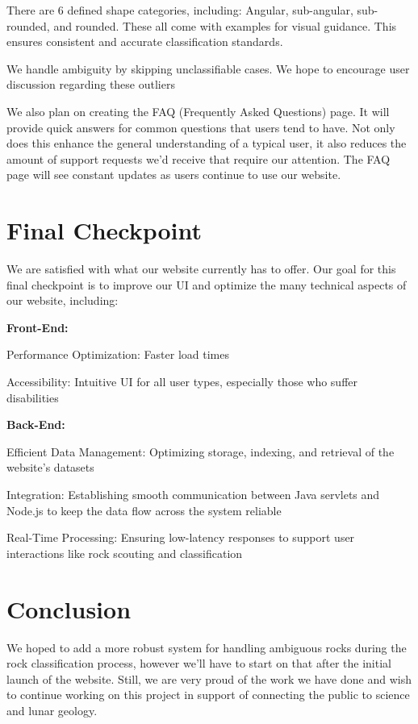 \documentclass{article}
\begin{document}
There are 6 defined shape categories, including: Angular, sub-angular, sub-rounded, and rounded. These all come
with examples for visual guidance. This ensures consistent and accurate classification standards.

We handle ambiguity by skipping unclassifiable cases. We hope to encourage user discussion regarding these outliers

We also plan on creating the FAQ (Frequently Asked Questions) page. It will provide quick answers for common
questions that users tend to have. Not only does this enhance the general understanding of a typical user, it also
reduces the amount of support requests we'd receive that require our attention.
The FAQ page will see constant updates as users continue to use our website.
\section{Final Checkpoint}
We are satisfied with what our website currently has to offer. Our goal for this final checkpoint is to improve our
UI and optimize the many technical aspects of our website, including:

\textbf{Front-End: }

Performance Optimization: Faster load times 

Accessibility: Intuitive UI for all user types, especially those who suffer disabilities

\textbf{Back-End: }

Efficient Data Management: Optimizing storage, indexing, and retrieval of the website's datasets

Integration: Establishing smooth communication between Java servlets and Node.js to keep the data flow across the system reliable

Real-Time Processing: Ensuring low-latency responses to support user interactions like rock scouting and classification

\section{Conclusion}
We hoped to add a more robust system for handling ambiguous rocks during the rock classification process, however we'll have to start on that after the initial launch of the website. Still, we are very proud of the work we have done and wish to continue working on this project in support of connecting the public to science and lunar geology.
\end{document}
